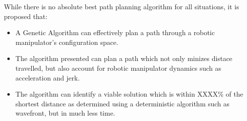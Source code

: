 While there is no absolute best path planning algorithm for all situations, it is proposed that:
\begin{itemize}
	\item A Genetic Algorithm can effectively plan a path through a robotic manipulator's configuration space.
	\item The algorithm presented can plan a path which not only minizes distace travelled, but also account for robotic manipulator dynamics such as acceleration and jerk.
	\item The algorithm can identify a viable solution which is within XXXX\% of the shortest distance as determined using a deterministic algorithm such as wavefront, but in much less time.
\end{itemize}

